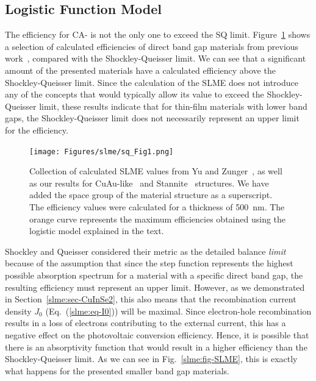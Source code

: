\begin{refsection}
\subsection{Logistic Function Model} \label{slme:sec-logistic} 
 
The efficiency for CA- is not the only one to exceed the SQ limit. 
Figure~\ref{slme:fig-logistic} shows a selection of calculated efficiencies of 
direct band gap materials from previous work~\cite{Yu2012, Bercx2016, 
Sarmadian2016}, compared with the Shockley-Queisser limit.  We can see that a 
significant amount of the presented materials have a calculated efficiency 
above the Shockley-Queisser limit. Since the calculation of the SLME does not 
introduce any of the concepts that would typically allow its value to exceed 
the Shockley-Queisser limit, these results indicate that for thin-film 
materials with lower band gaps, the Shockley-Queisser limit does not 
necessarily represent an upper limit for the efficiency. 
 
\begin{figure}[h] 
\centering 
\texttt{[image: Figures/slme/sq\_Fig1.png]} 
\caption{Collection of calculated SLME values from Yu and 
Zunger~\cite{Yu2012}, as well as our results for CuAu-like~\cite{Bercx2016} 
and Stannite~\cite{Sarmadian2016} structures. We have added the space group of 
the material structure as a superscript. The efficiency values were calculated 
for a thickness of 500~\si{\nano\meter}. The orange curve represents the 
maximum efficiencies obtained using the logistic model explained in the text.} 
\label{slme:fig-logistic} 
\end{figure} 
 
Shockley and Queisser considered their metric as the detailed balance 
\textit{limit} because of the assumption that since the step function 
represents the highest possible absorption spectrum for a material with a 
specific direct band gap, the resulting efficiency must represent an upper 
limit. However, as we demonstrated in Section~\ref{slme:sec-CuInSe2}, this 
also means that the recombination current density $J_0$ 
(Eq.~(\ref{slme:eq-I0})) will be maximal. Since electron-hole recombination 
results in a loss of electrons contributing to the external current, this has 
a negative effect on the photovoltaic conversion efficiency. Hence, it is 
possible that there is an absorptivity function that would result in a higher 
efficiency than the Shockley-Queisser limit. As we can see in 
Fig.~\ref{slme:fig-SLME}, this is exactly what happens for the presented 
smaller band gap materials. 
 

\end{refsection}
